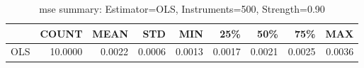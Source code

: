 \begin{table}[ht]
\centering
\caption{mse summary: Estimator=OLS, Instruments=500, Strength=0.90}
\begin{tabular}{lrrrrrrrr}
\toprule
 & COUNT & MEAN & STD & MIN & 25\% & 50\% & 75\% & MAX \\
\midrule
OLS & 10.0000 & 0.0022 & 0.0006 & 0.0013 & 0.0017 & 0.0021 & 0.0025 & 0.0036 \\
\bottomrule
\end{tabular}
\end{table}
